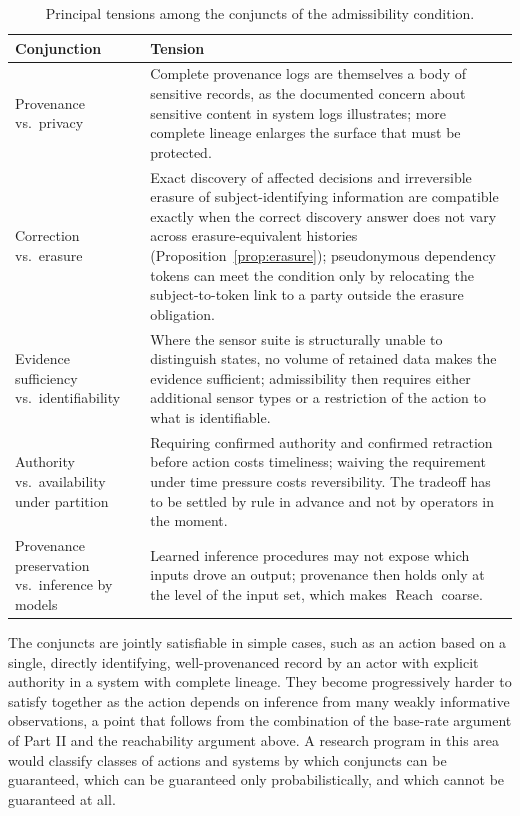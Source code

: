 \documentclass[11pt]{article}
\theoremstyle{plain}
\theoremstyle{definition}
\theoremstyle{remark}
\newcommand{\Reach}{\operatorname{Reach}}
\begin{document}
\begin{table}[h]
\centering
\small
\begin{tabular}{p{3.6cm}p{9.9cm}}
\toprule
Conjunction & Tension\\
\midrule
Provenance vs.\ privacy & Complete provenance logs are themselves a body of sensitive records, as the documented concern about sensitive content in system logs illustrates; more complete lineage enlarges the surface that must be protected.\\
Correction vs.\ erasure & Exact discovery of affected decisions and irreversible erasure of subject-identifying information are compatible exactly when the correct discovery answer does not vary across erasure-equivalent histories (Proposition~\ref{prop:erasure}); pseudonymous dependency tokens can meet the condition only by relocating the subject-to-token link to a party outside the erasure obligation.\\
Evidence sufficiency vs.\ identifiability & Where the sensor suite is structurally unable to distinguish states, no volume of retained data makes the evidence sufficient; admissibility then requires either additional sensor types or a restriction of the action to what is identifiable.\\
Authority vs.\ availability under partition & Requiring confirmed authority and confirmed retraction before action costs timeliness; waiving the requirement under time pressure costs reversibility. The tradeoff has to be settled by rule in advance and not by operators in the moment.\\
Provenance preservation vs.\ inference by models & Learned inference procedures may not expose which inputs drove an output; provenance then holds only at the level of the input set, which makes $\Reach$ coarse.\\
\bottomrule
\end{tabular}
\caption{Principal tensions among the conjuncts of the admissibility condition.}
\label{tab:tensions}
\end{table}

The conjuncts are jointly satisfiable in simple cases, such as an action based on a single, directly identifying, well-provenanced record by an actor with explicit authority in a system with complete lineage. They become progressively harder to satisfy together as the action depends on inference from many weakly informative observations, a point that follows from the combination of the base-rate argument of Part II and the reachability argument above. A research program in this area would classify classes of actions and systems by which conjuncts can be guaranteed, which can be guaranteed only probabilistically, and which cannot be guaranteed at all.
\end{document}
